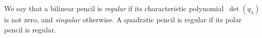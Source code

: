\documentclass{amsart}
\def\chk#1{#1^{\smash{\scalebox{.7}[1.4]{\rotatebox{90}{\guilsinglleft}}}}}
\DeclareMathOperator\PGL{PGL}
\begin{document}
We say that a bilinear pencil is \emph{regular}
if its characteristic polynomial~$\det (q_λ)$ is not zero,
and \emph{singular} otherwise.
A quadratic pencil is regular if its polar pencil is regular.


% 
% 
\end{document}
